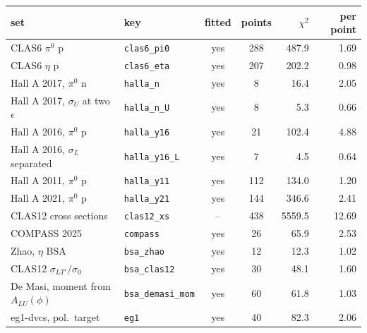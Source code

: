 \begin{tabular}{llccrr}
\toprule
set & key & fitted & points & $\chi^2$ & per point \\
\midrule
CLAS6 $\pi^0$ p & \texttt{clas6\_pi0} & yes & 288 & 487.9 & 1.69 \\
CLAS6 $\eta$ p & \texttt{clas6\_eta} & yes & 207 & 202.2 & 0.98 \\
Hall A 2017, $\pi^0$ n & \texttt{halla\_n} & yes & 8 & 16.4 & 2.05 \\
Hall A 2017, $\sigma_U$ at two $\epsilon$ & \texttt{halla\_n\_U} & yes & 8 & 5.3 & 0.66 \\
Hall A 2016, $\pi^0$ p & \texttt{halla\_y16} & yes & 21 & 102.4 & 4.88 \\
Hall A 2016, $\sigma_L$ separated & \texttt{halla\_y16\_L} & yes & 7 & 4.5 & 0.64 \\
Hall A 2011, $\pi^0$ p & \texttt{halla\_y11} & yes & 112 & 134.0 & 1.20 \\
Hall A 2021, $\pi^0$ p & \texttt{halla\_y21} & yes & 144 & 346.6 & 2.41 \\
CLAS12 cross sections & \texttt{clas12\_xs} & -- & 438 & 5559.5 & 12.69 \\
COMPASS 2025 & \texttt{compass} & yes & 26 & 65.9 & 2.53 \\
Zhao, $\eta$ BSA & \texttt{bsa\_zhao} & yes & 12 & 12.3 & 1.02 \\
CLAS12 $\sigma_{LT'}/\sigma_0$ & \texttt{bsa\_clas12} & yes & 30 & 48.1 & 1.60 \\
De Masi, moment from $A_{LU}(\phi)$ & \texttt{bsa\_demasi\_mom} & yes & 60 & 61.8 & 1.03 \\
eg1-dvcs, pol.\ target & \texttt{eg1} & yes & 40 & 82.3 & 2.06 \\
\bottomrule
\end{tabular}
